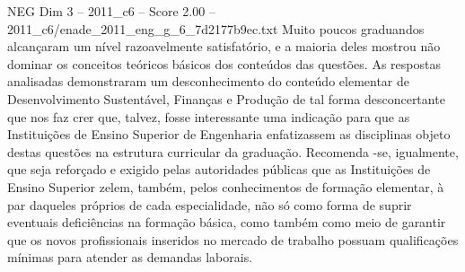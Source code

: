 \begin{textsample}{NEG Dim 3 – 2011\_c6 – Score 2.00 – 2011\_c6/enade\_2011\_eng\_g\_6\_7d2177b9ec.txt}
Muito poucos graduandos alcançaram um nível razoavelmente satisfatório, e a maioria deles mostrou não dominar os conceitos teóricos básicos dos conteúdos das questões.
As respostas analisadas demonstraram um desconhecimento do conteúdo elementar de Desenvolvimento Sustentável, Finanças e Produção de tal forma desconcertante que nos faz crer que, talvez, fosse interessante uma indicação para que as Instituições de Ensino Superior de Engenharia enfatizassem as disciplinas objeto destas questões na estrutura curricular da graduação.
Recomenda -se, igualmente, que seja reforçado e exigido pelas autoridades públicas que as Instituições de Ensino Superior zelem, também, pelos conhecimentos de formação elementar, à par daqueles próprios de cada especialidade, não só como forma de suprir eventuais deficiências na formação básica, como também como meio de garantir que os novos profissionais inseridos no mercado de trabalho possuam qualificações mínimas para atender as demandas laborais.

\end{textsample}
